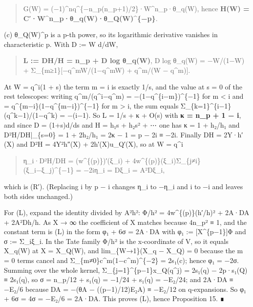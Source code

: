 \documentclass[11pt,a4paper]{article}
\theoremstyle{named}
\begin{document}
\begin{quote}
G(W) = (−1)\textasciicircum{}nq\textasciicircum{}\{−n\_p(n\_p+1)/2\}·W\textasciicircum{}n\_p·θ\_q(W),  hence  \textbf{H(W) = C′·W\textasciicircum{}n\_p·θ\_q(W)·θ\_Q(W)\textasciicircum{}\{−p\}}.
\end{quote}

(c) θ\_Q(W)\textasciicircum{}p is a p-th power, so its logarithmic derivative vanishes in characteristic p. With D := W d/dW,

\begin{quote}
\textbf{L := DH/H = n\_p + D log θ\_q(W)},  D log θ\_q(W) = −W/(1−W) + Σ\_\{m≥1\}[−q\textasciicircum{}mW/(1−q\textasciicircum{}mW) + q\textasciicircum{}m/(W − q\textasciicircum{}m)].
\end{quote}

At W = q\textasciicircum{}i(1 + s) the term m = i is exactly 1/s, and the value at s = 0 of the rest telescopes: writing q\textasciicircum{}m/(q\textasciicircum{}i−q\textasciicircum{}m) = −(1−q\textasciicircum{}\{i−m\})\textasciicircum{}\{−1\} for m \textless{} i and = q\textasciicircum{}\{m−i\}(1−q\textasciicircum{}\{m−i\})\textasciicircum{}\{−1\} for m \textgreater{} i, the sum equals Σ\_\{k=1\}\textasciicircum{}\{i−1\}(q\textasciicircum{}k−1)/(1−q\textasciicircum{}k) = −(i−1). So L = 1/s + κ + O(s) with \textbf{κ = n\_p + 1 − i}, and since D = (1+s)d/ds and H = h₁s + h₂s² + ⋯ one has κ = 1 + h₂/h₁ and D²H/DH|\_\{s=0\} = 1 + 2h₂/h₁ = 2κ − 1 = p − 2i ≡ −2i. Finally DH = 2Y·h′(X) and D²H = 4Y²h″(X) + 2h′(X)u\_Q′(X), so at W = q\textasciicircum{}i

\begin{quote}
η\_i·D²H/DH = (w\textasciicircum{}\{(p)\})′(ξ\_i) + 4w\textasciicircum{}\{(p)\}(ξ\_i)Σ\_\{j≠i\}(ξ\_i−ξ\_j)\textasciicircum{}\{−1\} = −2iη\_i = Dξ\_i = A²Dξ\_i,
\end{quote}

which is (R′). (Replacing i by p − i changes η\_i to −η\_i and i to −i and leaves both sides unchanged.)

For (L), expand the identity divided by A²h²: Φ/h² = 4w\textasciicircum{}\{(p)\}(h′/h)² + 2A·DA + 2A²Dh/h. As X → ∞ the coefficient of X matches because 4n\_p² ≡ 1, and the constant term is (L) in the form φ₁ + 6σ = 2A·DA with φ₁ := [X\textasciicircum{}\{p−1\}]Φ and σ := Σ\_iξ\_i. In the Tate family Φ/h² is the x-coordinate of V, so it equals X\_q(W) at X = X\_Q(W), and lim\_\{W→1\}(X\_q − X\_Q) = 0 because the m = 0 terms cancel and Σ\_\{m≠0\}c\textasciicircum{}m(1−c\textasciicircum{}m)\textasciicircum{}\{−2\} = 2s₁(c); hence φ₁ = −2σ. Summing over the whole kernel, Σ\_\{j=1\}\textasciicircum{}\{p−1\}x\_Q(q\textasciicircum{}j) = 2s₁(q) − 2p·s₁(Q) ≡ 2s₁(q), so σ = n\_p/12 + s₁(q) = −1/24 + s₁(q) = −E₂/24; and 2A·DA ≡ −E₂/6 because DA = −(θA − ((p−1)/12)E₂A) ≡ −E₂/12 on q-expansions. So φ₁ + 6σ = 4σ = −E₂/6 = 2A·DA. This proves (L), hence Proposition 15. ∎
\end{document}
